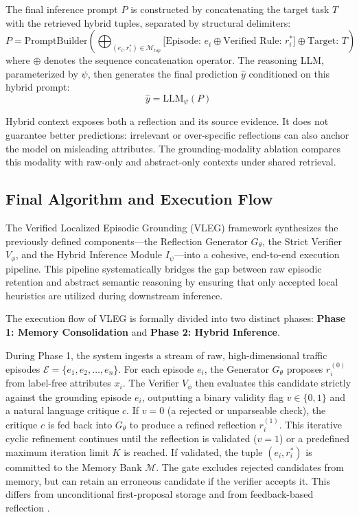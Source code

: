 \documentclass[onecolumn]{IEEEtran}
\numberwithin{equation}{section}
\theoremstyle{definition}
\theoremstyle{remark}
\begin{document}
The final inference prompt $P$ is constructed by concatenating the target task $T$ with the retrieved hybrid tuples, separated by structural delimiters:
\begin{equation}
    P = \text{PromptBuilder}\left( \bigoplus_{(e_i, r_i^*) \in \mathcal{M}_{top}} \Big[ \text{Episode: } e_i \oplus \text{Verified Rule: } r_i^* \Big] \oplus \text{Target: } T \right)
\end{equation}
where $\oplus$ denotes the sequence concatenation operator. The reasoning LLM, parameterized by $\psi$, then generates the final prediction $\hat{y}$ conditioned on this hybrid prompt:
\begin{equation}
    \hat{y} = \text{LLM}_\psi(P)
\end{equation}



Hybrid context exposes both a reflection and its source evidence. It does not guarantee better predictions: irrelevant or over-specific reflections can also anchor the model on misleading attributes. The grounding-modality ablation compares this modality with raw-only and abstract-only contexts under shared retrieval.

\subsection{Final Algorithm and Execution Flow}

The Verified Localized Episodic Grounding (VLEG) framework synthesizes the previously defined components—the Reflection Generator $G_\theta$, the Strict Verifier $V_\phi$, and the Hybrid Inference Module $I_\psi$—into a cohesive, end-to-end execution pipeline. This pipeline systematically bridges the gap between raw episodic retention \cite{brown2020language} and abstract semantic reasoning \cite{agarwal2026hypothesis} by ensuring that only accepted local heuristics are utilized during downstream inference.

The execution flow of VLEG is formally divided into two distinct phases: \textbf{Phase 1: Memory Consolidation} and \textbf{Phase 2: Hybrid Inference}.

During Phase 1, the system ingests a stream of raw, high-dimensional traffic episodes $\mathcal{E} = \{e_1, e_2, \dots, e_n\}$. For each episode $e_i$, the Generator $G_\theta$ proposes $r_i^{(0)}$ from label-free attributes $x_i$. The Verifier $V_\phi$ then evaluates this candidate strictly against the grounding episode $e_i$, outputting a binary validity flag $v \in \{0, 1\}$ and a natural language critique $c$. If $v = 0$ (a rejected or unparseable check), the critique $c$ is fed back into $G_\theta$ to produce a refined reflection $r_i^{(1)}$. This iterative cyclic refinement continues until the reflection is validated ($v=1$) or a predefined maximum iteration limit $K$ is reached. If validated, the tuple $(e_i, r_i^*)$ is committed to the Memory Bank $\mathcal{M}$. The gate excludes rejected candidates from memory, but can retain an erroneous candidate if the verifier accepts it. This differs from unconditional first-proposal storage and from feedback-based reflection \cite{shinn2023reflexion}.
\end{document}
